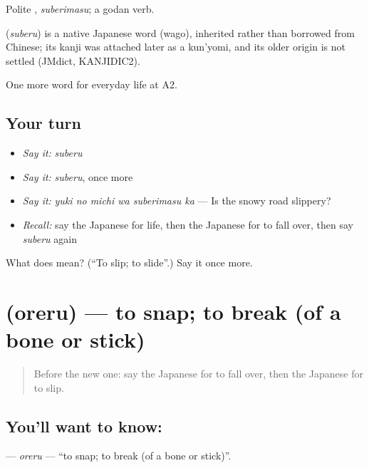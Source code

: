Polite \textbf{}, \emph{suberimasu}; a godan verb.

\begin{cousinweb}
\textbf{} (\emph{suberu}) is a native Japanese word (wago), inherited rather than borrowed from Chinese; its kanji was attached later as a kun'yomi, and its older origin is not settled (JMdict, KANJIDIC2).
\end{cousinweb}

\begin{grammarlens}[title={What you've built}]
One more word for everyday life at A2.
\end{grammarlens}

\subsection*{Your turn}
\begin{itemize}
\raggedright
  \item \emph{Say it:} \emph{suberu}
  \item \emph{Say it:} \emph{suberu}, once more
  \item \emph{Say it:} \emph{yuki no michi wa suberimasu ka} — Is the snowy road slippery?
  \item \emph{Recall:} say the Japanese for life, then the Japanese for to fall over, then say \emph{suberu} again
\end{itemize}

\begin{tcolorbox}[breakable,colback=teal!4,colframe=teal!35!black,title={Before you move on}]
What does  mean? (\textquotedblleft{}To slip; to slide\textquotedblright{}.) Say it once more.
\end{tcolorbox}
\section[\texorpdfstring{\ja{おれる} (oreru)}{おれる (oreru)}]{ (oreru) — to snap; to break (of a bone or stick)}

\label{lesson:JA-C219-oreru}



\begin{quote}
Before the new one: say the Japanese for to fall over, then the Japanese for to slip.
\end{quote}

\subsection*{You'll want to know: }
\textbf{} — \emph{oreru} — \textquotedblleft{}to snap; to break (of a bone or stick)\textquotedblright{}.

